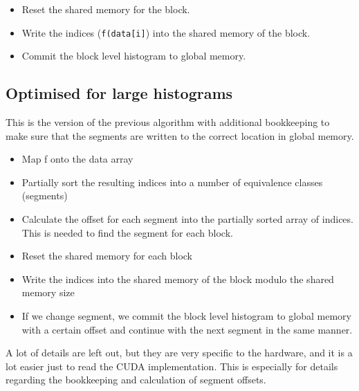 \documentclass[12pt, a4paper, hidelinks]{article}
\renewcommand{\tt}[1]{\texttt{#1}}
\begin{document}
\begin{itemize}
\item Reset the shared memory for the block.
\item Write the indices (\tt{f(data[i]}) into the shared memory of the block.
\item Commit the block level histogram to global memory.
\end{itemize}

\subsection{Optimised for large histograms}
This is the version of the previous algorithm with additional bookkeeping
to make sure that the segments are written to the correct location in global memory.

\begin{itemize}
\item
  Map f onto the data array
\item
  Partially sort the resulting indices into a number of equivalence classes (segments)
\item
  Calculate the offset for each segment into
  the partially sorted array of indices.
  This is needed to find the segment for each block.
\item
  Reset the shared memory for each block
\item
  Write the indices into the shared memory of the block modulo the shared memory size
\item
  If we change segment,
  we commit the block level histogram to global memory with a certain
  offset and continue with the next segment in the same manner.
\end{itemize}

A lot of details are left out, but they are very specific to the hardware,
and it is a lot easier just to read the CUDA implementation.
This is especially for details regarding the bookkeeping and calculation
of segment offsets.

\section{}
\section{}


\end{document}
